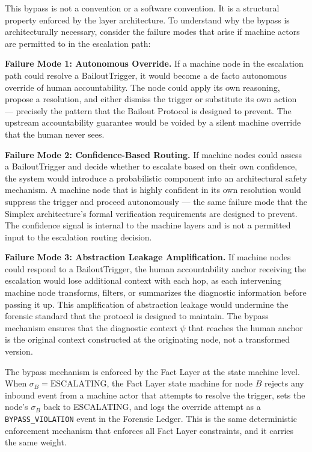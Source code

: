 \documentclass[12pt]{article}
\begin{document}
This bypass is not a convention or a software convention. It is a structural property enforced by the layer architecture. To understand why the bypass is architecturally necessary, consider the failure modes that arise if machine actors are permitted to in the escalation path:

\bigskip

\noindent\textbf{Failure Mode 1: Autonomous Override.} If a machine node in the escalation path could resolve a BailoutTrigger, it would become a de facto autonomous override of human accountability. The node could apply its own reasoning, propose a resolution, and either dismiss the trigger or substitute its own action --- precisely the pattern that the Bailout Protocol is designed to prevent. The upstream accountability guarantee would be voided by a silent machine override that the human never sees.

\bigskip

\noindent\textbf{Failure Mode 2: Confidence-Based Routing.} If machine nodes could assess a BailoutTrigger and decide whether to escalate based on their own confidence, the system would introduce a probabilistic component into an architectural safety mechanism. A machine node that is highly confident in its own resolution would suppress the trigger and proceed autonomously --- the same failure mode that the Simplex architecture's formal verification requirements are designed to prevent. The confidence signal is internal to the machine layers and is not a permitted input to the escalation routing decision.

\bigskip

\noindent\textbf{Failure Mode 3: Abstraction Leakage Amplification.} If machine nodes could respond to a BailoutTrigger, the human accountability anchor receiving the escalation would lose additional context with each hop, as each intervening machine node transforms, filters, or summarizes the diagnostic information before passing it up. This amplification of abstraction leakage would undermine the forensic standard that the protocol is designed to maintain. The bypass mechanism ensures that the diagnostic context $\psi$ that reaches the human anchor is the original context constructed at the originating node, not a transformed version.

\bigskip

The bypass mechanism is enforced by the Fact Layer at the state machine level. When $\sigma_B = \text{ESCALATING}$, the Fact Layer state machine for node $B$ rejects any inbound event from a machine actor that attempts to resolve the trigger, sets the node's $\sigma_B$ back to ESCALATING, and logs the override attempt as a \texttt{BYPASS\_VIOLATION} event in the Forensic Ledger. This is the same deterministic enforcement mechanism that enforces all Fact Layer constraints, and it carries the same weight.
\end{document}

